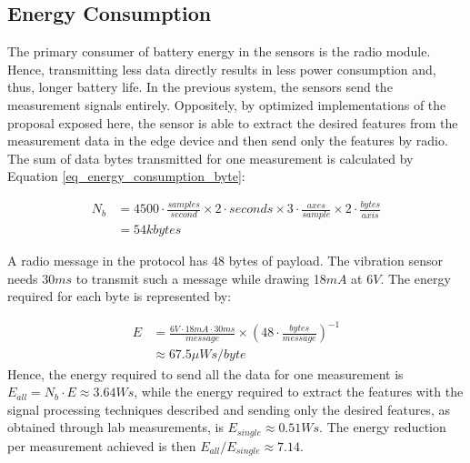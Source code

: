 \documentclass[conference]{IEEEtran}
\begin{document}


\subsection{Energy Consumption}

The primary consumer of battery energy in the sensors is the radio module. Hence, transmitting less data directly results in less power consumption and, thus, longer battery life. In the previous system, the sensors send the measurement signals entirely. Oppositely, by optimized implementations of the proposal exposed here, the sensor is able to extract the desired features from the measurement data in the edge device and then send only the features by radio. The sum of data bytes transmitted for one measurement is calculated by Equation \ref{eq_energy_consumption_byte}:

\begin{equation}
\begin{aligned}
	N_{b} &= 4500 \cdot  \frac{samples}{second} \times 2 \cdot seconds \times 3 \cdot \frac{axes}{sample} \times 2 \cdot \frac{bytes}{axis} \\
	  &= 54 kbytes
\end{aligned}
\label{eq_energy_consumption_byte}
\end{equation}

A radio message in the protocol has 48 bytes of payload. The vibration sensor needs 30$ms$ to transmit such a message while drawing 18$mA$ at 6$V$. The energy required for each byte is represented by: 

\begin{equation}
\begin{aligned}
	E &= \frac{6V \cdot 18mA \cdot 30ms}{message} \times \left( 48 \cdot \frac{bytes}{message} \right)^{-1} \\
	  & \approx 67.5 \mu Ws/byte
\end{aligned}
\label{eq_energy_consumption_pro_byte}
\end{equation}
Hence, the energy required to send all the data for one measurement is $E_{all} = N_{b} \cdot E \approx 3.64 Ws$, while the energy required to extract the features with the signal processing techniques described and sending only the desired features, as obtained through lab measurements, is $E_{single} \approx 0.51 Ws$. The energy reduction per measurement achieved is then $E_{all}/E_{single} \approx 7.14$.
\end{document}
